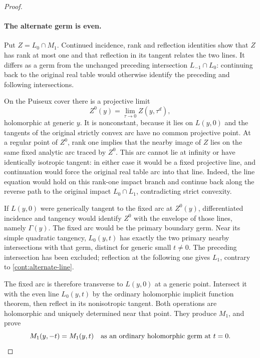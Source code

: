 \begin{proof}
\paragraph{The alternate germ is even.}
Put \(Z=L_0\cap M_1\).  Continued incidence, rank and
reflection identities show that \(Z\) has rank at most
one and that reflection in its tangent relates the two
lines.  It differs as a germ from the unchanged preceding
intersection \(L_{-1}\cap L_0\): continuing back to the
original real table would otherwise identify the preceding
and following intersections.

On the Puiseux cover there is a projective limit
\[
 Z^0(y)=\lim_{\tau\to0}Z(y,\tau^d),
\]
holomorphic at generic \(y\).  It is nonconstant, because
it lies on \(L(y,0)\) and the tangents of the original
strictly convex arc have no common projective point.
At a regular point of \(Z^0\), rank one implies that the
nearby image of \(Z\) lies on the same fixed analytic arc
traced by \(Z^0\).  This arc cannot lie at infinity or have
identically isotropic tangent: in either case it would be
a fixed projective line, and continuation would force
the original real table arc into that line. Indeed, the line equation
would hold on this rank-one impact branch and continue back along the
reverse path to the original impact \(L_0\cap L_1\), contradicting
strict convexity.

If \(L(y,0)\) were generically tangent to the fixed arc
at \(Z^0(y)\), differentiated incidence and tangency would
identify \(Z^0\) with the envelope of those lines,
namely \(\Gamma(y)\).  The fixed arc would be the primary
boundary germ.  Near its simple quadratic tangency,
\(L_0(y,t)\) has exactly the two primary nearby
intersections with that germ, distinct for generic small
\(t\ne0\).  The preceding intersection has been excluded;
reflection at the following one gives \(L_1\), contrary
to \eqref{cont:alternate-line}.

The fixed arc is therefore transverse to \(L(y,0)\) at a
generic point.  Intersect it with the even line \(L_0(y,t)\)
by the ordinary holomorphic implicit function theorem,
then reflect in its nonisotropic tangent.  Both operations
are holomorphic and uniquely determined near that point.
They produce \(M_1\), and prove
\begin{equation}
 M_1(y,-t)=M_1(y,t)
 \quad\hbox{as an ordinary holomorphic germ at }t=0.
 \label{cont:alternate-even}
\end{equation}


\end{proof}
